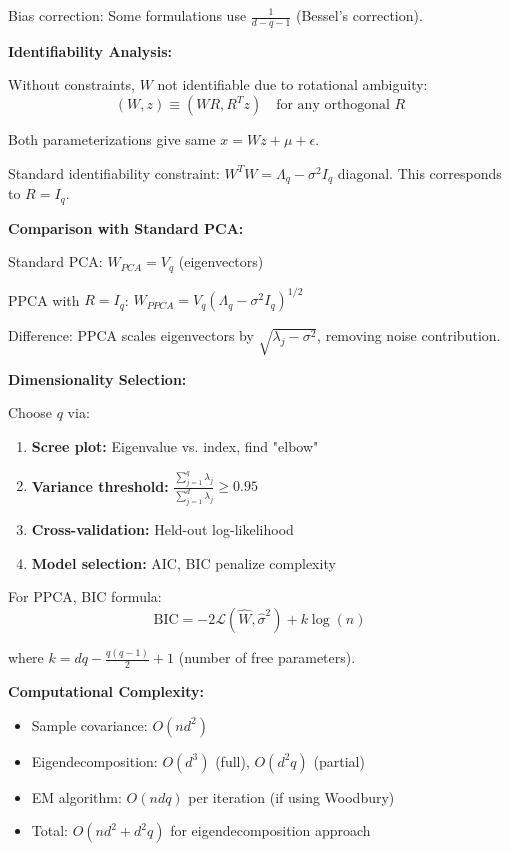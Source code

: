 \documentclass[12pt]{article}
\begin{document}
\begin{explanation}
Bias correction: Some formulations use $\frac{1}{d-q-1}$ (Bessel's correction).

\textbf{Identifiability Analysis:}

Without constraints, $W$ not identifiable due to rotational ambiguity:
\[
(W, z) \equiv (WR, R^Tz) \quad \text{for any orthogonal } R
\]

Both parameterizations give same $x = Wz + \mu + \epsilon$.

Standard identifiability constraint: $W^TW = \Lambda_q - \sigma^2 I_q$ diagonal. This corresponds to $R = I_q$.

\textbf{Comparison with Standard PCA:}

Standard PCA: $W_{PCA} = V_q$ (eigenvectors)

PPCA with $R=I_q$: $W_{PPCA} = V_q(\Lambda_q - \sigma^2 I_q)^{1/2}$

Difference: PPCA scales eigenvectors by $\sqrt{\lambda_j - \sigma^2}$, removing noise contribution.

\textbf{Dimensionality Selection:}

Choose $q$ via:
\begin{enumerate}
    \item \textbf{Scree plot:} Eigenvalue vs. index, find "elbow"
    \item \textbf{Variance threshold:} $\frac{\sum_{j=1}^q \lambda_j}{\sum_{j=1}^d \lambda_j} \geq 0.95$
    \item \textbf{Cross-validation:} Held-out log-likelihood
    \item \textbf{Model selection:} AIC, BIC penalize complexity
\end{enumerate}

For PPCA, BIC formula:
\[
\text{BIC} = -2\mathcal{L}(\hat{W}, \hat{\sigma}^2) + k\log(n)
\]

where $k = dq - \frac{q(q-1)}{2} + 1$ (number of free parameters).

\textbf{Computational Complexity:}

\begin{itemize}
    \item Sample covariance: $O(nd^2)$
    \item Eigendecomposition: $O(d^3)$ (full), $O(d^2q)$ (partial)
    \item EM algorithm: $O(ndq)$ per iteration (if using Woodbury)
    \item Total: $O(nd^2 + d^2q)$ for eigendecomposition approach
\end{itemize}


\end{explanation}
\end{document}
